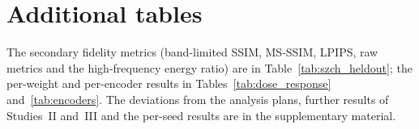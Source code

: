 \section{Additional tables}
\label{app:extra}
The secondary fidelity metrics (band-limited SSIM, MS-SSIM, LPIPS, raw metrics and the high-frequency energy ratio) are in
Table~\ref{tab:szch_heldout}; the per-weight and per-encoder results in Tables~\ref{tab:dose_response} and~\ref{tab:encoders}. The
deviations from the analysis plans, further results of Studies~II and~III and the per-seed results are in the supplementary material.

